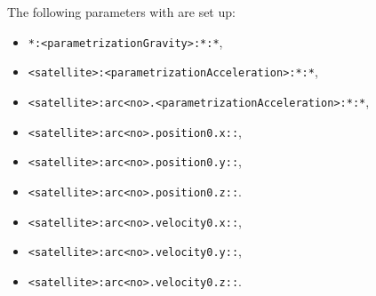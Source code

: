 The following parameters with  are set up:
\begin{itemize}
\item \verb|*:<parametrizationGravity>:*:*|,
\item \verb|<satellite>:<parametrizationAcceleration>:*:*|,
\item \verb|<satellite>:arc<no>.<parametrizationAcceleration>:*:*|,
\item \verb|<satellite>:arc<no>.position0.x::|,
\item \verb|<satellite>:arc<no>.position0.y::|,
\item \verb|<satellite>:arc<no>.position0.z::|.
\item \verb|<satellite>:arc<no>.velocity0.x::|,
\item \verb|<satellite>:arc<no>.velocity0.y::|,
\item \verb|<satellite>:arc<no>.velocity0.z::|.
\end{itemize}


